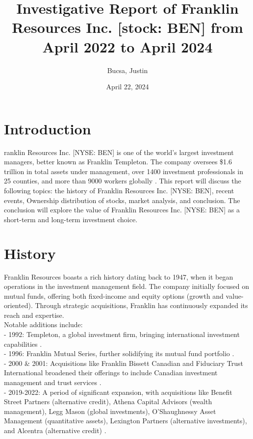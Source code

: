 \documentclass[9pt,a4paper,twoside]{tau}
\title{Investigative Report of Franklin Resources Inc. [stock: BEN] from April 2022 to April 2024}
\author[a,1]{Bucsa, Justin}
\affil[a]{Stealth}
\date{April 22, 2024}
\begin{document}
		
	\maketitle
	\thispagestyle{firststyle}
	\tauabstract
	\tableofcontents

\section{Introduction}

    ranklin Resources Inc. [NYSE: BEN] is one of the world’s largest investment managers, better known as Franklin Templeton. The company oversees \$1.6 trillion in total assets under management, over 1400 investment professionals in 25 counties, and more than 9000 workers globally \cite{franklin-resources-inc-2023}. This report will discuss the following topics: the history of Franklin Resources Inc. [NYSE: BEN], recent events, Ownership distribution of stocks, market analysis, and conclusion. The conclusion will explore the value of Franklin Resources Inc.
    [NYSE: BEN] as a short-term and long-term investment choice.
    

\section{History}
    
    Franklin Resources boasts a rich history dating back to 1947, when it began operations in the investment management field. The company initially focused on mutual funds, offering both fixed-income and equity options (growth and value-oriented). Through strategic acquisitions, Franklin has continuously expanded its reach and expertise.\\
    Notable additions include: \\
    - 1992: Templeton, a global investment firm, bringing international investment capabilities \cite{franklin-resources-inc-2023}.\\
    - 1996: Franklin Mutual Series, further solidifying its mutual fund portfolio \cite{franklin-resources-inc-2023}.\\
    - 2000 \& 2001: Acquisitions like Franklin Bissett Canadian and Fiduciary Trust International broadened their offerings to include Canadian investment management and trust services \cite{franklin-resources-inc-2023}.\\
    - 2019-2022: A period of significant expansion, with acquisitions like Benefit Street Partners (alternative credit), Athena Capital Advisors (wealth management), Legg Mason (global investments), O’Shaughnessy Asset Management (quantitative assets), Lexington Partners (alternative investments), and Alcentra (alternative credit) \cite{franklin-resources-inc-2023}.\\
    
\end{document}
